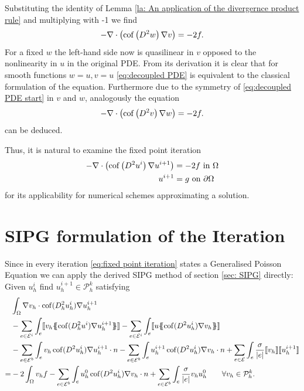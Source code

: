 Substituting the identity of Lemma \ref{la: An application of the divergernce product rule} and multiplying with -1 we find
\begin{align}
	- \nabla \cdot \left( \operatorname{cof} \left(  D^2 w \right) \nabla v \right)  = -2f.  \label{eq:decoupled PDE}
\end{align}
For a fixed $w$ the left-hand side now is quasilinear in $v$ opposed to the nonlinearity in $u$ in the original PDE. From its derivation it is clear that for smooth functions $w=u, v=u$ \eqref{eq:decoupled PDE} is equivalent to the classical formulation of the \MA equation. Furthermore due to the symmetry of \eqref{eq:decoupled PDE start} in $v$ and $w$, analogously the equation 
\begin{align}
	- \nabla \cdot \left( \operatorname{cof} \left(  D^2 v \right) \nabla w \right)  = -2f.  \label{eq:decoupled PDE two}
\end{align}
can be deduced.

Thus, it is natural to examine the fixed point iteration
\begin{align}
	\begin{split}
	- \nabla \cdot \left( \operatorname{cof} \left(  D^2 u^i \right) \nabla u^{i+1} \right)  &= -2f  \text{ in } \Omega \\
		u^{i+1} &= g \textnormal{ on } \partial \Omega
	\label{eq:fixed point iteration}
	\end{split}
\end{align}
for its applicability for numerical schemes approximating a \MA solution.

\section{SIPG formulation of the Iteration}\label{sec: SIPG MA}
Since in every iteration \eqref{eq:fixed point iteration} states a Generalised Poisson Equation we can apply the derived  SIPG method of section \ref{sec: SIPG} directly: Given $u^i_h$ find $u^{i+1}_h \in \mathcal P^k_h$ satisfying
\begin{align}
 &\int_{\Omega} \nabla v_h \cdot \cof(D_h^2 u_h^{i}) \nabla u_h^{i+1}  \nonumber\\
 & -\sum\limits_{e \in \bigEps^i}\int_{e} \jump {v_h \average { \cof(D_h^2 u^{i}) \nabla u_h^{i+1}} }
 - \sum\limits_{e \in \bigEps^i}\int_{e} \jump {u \average{ \cof(D^2 u_h^{i}) \nabla v_h} } \nonumber\\  
 & - \sum\limits_{e \in \bigEps^b}\int_{e} v_h \cof(D^2 u_h^{i}) \nabla u_h^{i+1}\cdot n 
    - \sum\limits_{e \in \bigEps^b}\int_{e} u_h^{i+1}\cof(D^2 u_h^{i}) \nabla v_h \cdot n
    +\sum\limits_{e \in \bigEps} \int_e \frac \sigma {|e|} \jump {v_h}  \jump {u_h^{i+1}}\nonumber\\
    =& - 2 \int_{\Omega}v_h f
    	 				-\sum\limits_{e \in \bigEps^b}\int_{e} u_h^0 \cof(D^2 u_h^{i}) \nabla v_h \cdot n 
    	 				+\sum\limits_{e \in \bigEps^b} \int_e \frac \sigma {|e|} v_h u_h^0    \qquad \forall v_h \in  \mathcal P^k_h.
    	\label{eq: sipg iteration}
\end{align}

